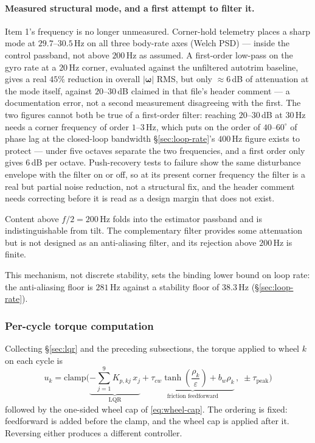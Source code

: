 \paragraph{Measured structural mode, and a first attempt to filter it.}
Item 1's frequency is no longer unmeasured. Corner-hold telemetry places a
sharp mode at $29.7$--$30.5$\,Hz on all three body-rate axes (Welch PSD) ---
inside the control passband, not above $200$\,Hz as assumed. A first-order
low-pass on the gyro rate at a $20$\,Hz corner, evaluated against the
unfiltered autotrim baseline, gives a real $45\%$ reduction in
overall $|\bm\omega|$ RMS, but only $\approx 6$\,dB of attenuation at the
mode itself, against $20$--$30$\,dB claimed in that file's header comment ---
a documentation error, not a second measurement disagreeing with the first.
The two figures cannot both be true of a first-order filter: reaching
$20$--$30$\,dB at $30$\,Hz needs a corner frequency of order $1$--$3$\,Hz,
which puts on the order of $40$--$60^\circ$ of phase lag at the closed-loop
bandwidth \S\ref{sec:loop-rate}'s $400$\,Hz figure exists to protect ---
under five octaves separate the two frequencies, and a first order only
gives $6$\,dB per octave. Push-recovery tests to failure show the same
disturbance envelope with the filter on or off, so at its present corner
frequency the filter is a real but partial noise reduction, not a
structural fix, and the header comment needs correcting before it is read
as a design margin that does not exist.

Content above $f/2 = 200$\,Hz folds into the estimator passband and is
indistinguishable from tilt. The complementary filter provides some
attenuation but is not designed as an anti-aliasing filter, and its rejection
above $200$\,Hz is finite.

This mechanism, not discrete stability, sets the binding lower bound on loop
rate: the anti-aliasing floor is $281$\,Hz against a stability floor of
$38.3$\,Hz (\S\ref{sec:loop-rate}).

\subsubsection{Per-cycle torque computation}
\label{sec:torque-computation}

Collecting \S\ref{sec:lqr} and the preceding subsections, the torque applied
to wheel $k$ on each cycle is
%
\begin{equation}
  \boxed{\;
  u_k = \mathrm{clamp}\!\Big(
    \underbrace{-\sum_{j=1}^{9} K_{p,kj}\,x_j}_{\text{LQR}}
    + \underbrace{\tau_{cw}\tanh\!\left(\frac{\rho_k}{\varepsilon}\right)
                  + b_w\rho_k}_{\text{friction feedforward}}\,,
    \;\pm\tau_{\mathrm{peak}}\Big)
  \;}
  \label{eq:torque-full}
\end{equation}
%
followed by the one-sided wheel cap of \eqref{eq:wheel-cap}. The ordering is
fixed: feedforward is added before the clamp, and the wheel cap is applied
after it. Reversing either produces a different controller.

